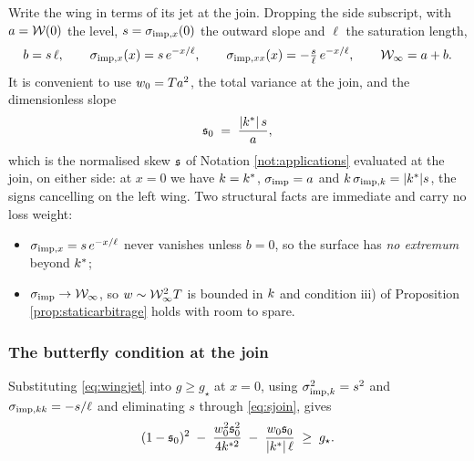 Write the wing in terms of its jet at the join. Dropping the side subscript, with $a=\mathcal{W}(0)$ the
level, $s=\sigma_{\mathrm{imp},x}(0)$ the outward slope and $\ell$ the saturation length,
\begin{equation}\label{eq:wingjet}
  b=s\,\ell,\qquad \sigma_{\mathrm{imp},x}(x)=s\,e^{-x/\ell},\qquad \sigma_{\mathrm{imp},xx}(x)=-\tfrac{s}{\ell}\,e^{-x/\ell},
  \qquad \mathcal{W}_{\infty}=a+b .
\end{equation}
It is convenient to use $w_{0}=T a^{2}$, the total variance at the join, and the dimensionless
slope
\begin{equation}\label{eq:sjoin}
  \mathfrak{s}_{0}\;=\;\frac{|k^{*}|\,s}{a},
\end{equation}
which is the normalised skew $\mathfrak{s}$ of Notation \ref{not:applications} evaluated at the join, on
either side: at $x=0$ we have $k=k^{*}$, $\sigma_{\mathrm{imp}}=a$ and $k\,\sigma_{\mathrm{imp},k}=|k^{*}|s$, the
signs cancelling on the left wing. Two structural facts are immediate and carry no loss
weight:
\begin{itemize}
  \item $\sigma_{\mathrm{imp},x}=s\,e^{-x/\ell}$ never vanishes unless $b=0$, so the surface has \emph{no extremum}
    beyond $k^{*}$;
  \item $\sigma_{\mathrm{imp}}\to\mathcal{W}_{\infty}$, so $w\sim\mathcal{W}_{\infty}^{2}T$ is bounded in $k$ and condition iii) of
    Proposition \ref{prop:staticarbitrage} holds with room to spare.
\end{itemize}

\subsubsection*{The butterfly condition at the join}

Substituting \eqref{eq:wingjet} into $g\ge g_{\star}$ at $x=0$, using
$\sigma_{\mathrm{imp},k}^{2}=s^{2}$ and $\sigma_{\mathrm{imp},kk}=-s/\ell$ and eliminating $s$ through \eqref{eq:sjoin}, gives
\begin{equation}
  (1-\mathfrak{s}_{0})^{2}\;-\;\frac{w_{0}^{2}\mathfrak{s}_{0}^{2}}{4k^{*2}}\;-\;\frac{w_{0}\mathfrak{s}_{0}}{|k^{*}|\,\ell}
  \;\ge\;g_{\star} .
  \label{eq:joinbutterfly}
\end{equation}


